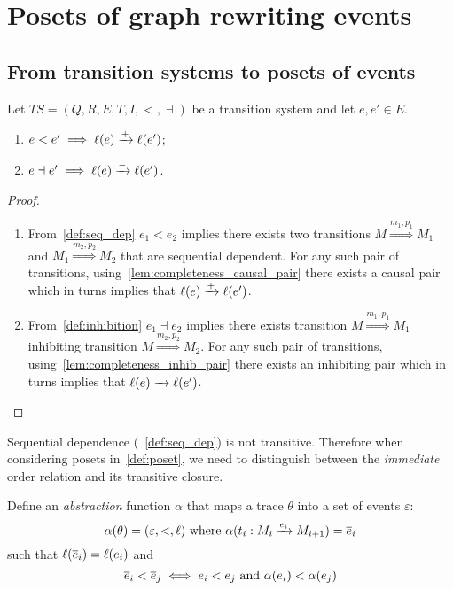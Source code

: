 \section{Posets of graph rewriting events}

\subsection{From transition systems to posets of events}

\begin{lemma}
  \label{lemma:pos_infl}
  Let $TS = (Q,R,E,T,I,<,\dashv)$ be a transition system and let $e,e' \in E$.
  \begin{enumerate}
  \item $e< e'\implies \ell(e)\xrightarrow{+}\ell(e')$;
  \item $e\dashv e' \implies\ell(e)\xrightarrow{-}\ell(e')$.
  \end{enumerate}
\end{lemma}
\begin{proof}
  \begin{enumerate}
  \item From~\autoref{def:seq_dep} $e_1 < e_2$ implies there exists two transitions $M\overset{m_1,p_1}{\Rightarrow} M_1$ and $M_1\overset{m_2,p_2}{\Rightarrow} M_2$ that are sequential dependent. For any such pair of transitions, using~\autoref{lem:completeness_causal_pair} there exists a causal pair which in turns implies that $\ell(e)\xrightarrow{+}\ell(e')$.

  \item From~\autoref{def:inhibition} $e_1 \dashv e_2$ implies there exists transition $M\overset{m_1,p_1}{\Rightarrow} M_1$ inhibiting transition $M\overset{m_2,p_2}{\Rightarrow} M_2$. For any such pair of transitions, using~\autoref{lem:completeness_inhib_pair} there exists an inhibiting pair which in turns implies that $\ell(e)\xrightarrow{-}\ell(e')$.
  \end{enumerate}
\end{proof}

\begin{remark}
  Sequential dependence (~\autoref{def:seq_dep}) is not transitive. Therefore when considering posets in~\autoref{def:poset}, we need to distinguish between the \emph{immediate} order relation and its transitive closure.
\end{remark}

\begin{definition}

  Define an \emph{abstraction} function $\alpha$ that maps a trace $\theta$ into a set of events $\varepsilon$:
  \[
  \alpha(\theta) = (\varepsilon,<,\ell) \text{ where }
  \alpha(t_i:M_i\mathrel{\xrightarrow{e_i}}M_{i+1}) = \overline{e}_i \]
  such that $\ell(\overline{e}_i) = \ell(e_i)$ and
  \[
  \overline{e}_i < \overline{e}_j \iff e_i < e_j\text{ and }\alpha(e_i)< \alpha(e_j)
  \]
\end{definition}

